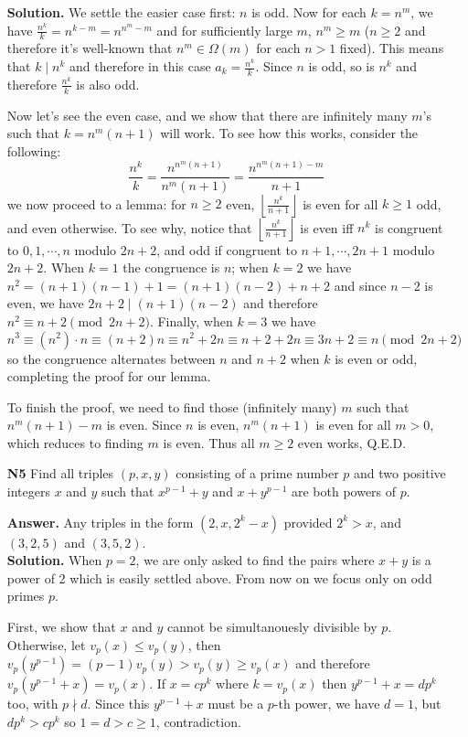 \documentclass[11pt,a4paper]{article}
\begin{document}
\begin{enumerate}
	\textbf{Solution.} We settle the easier case first: $n$ is odd. Now for each $k=n^m$, we have $\frac{n^k}{k}=n^{k-m}=n^{n^m-m}$ and for sufficiently large $m$, $n^m\ge m$ ($n\ge 2$ and therefore it's well-known that $n^m\in \Omega(m)$ for each $n>1$ fixed). This means that $k\mid n^k$ and therefore in this case $a_k=\frac{n^k}{k}$. Since $n$ is odd, so is $n^k$ and therefore $\frac{n^k}{k}$ is also odd. 
	
	Now let's see the even case, and we show that there are infinitely many $m$'s such that $k=n^m(n+1)$ will work. To see how this works, consider the following: 
	\[
	\frac{n^k}{k} = \frac{n^{n^m(n+1)}}{n^m(n+1)}
	=\frac{n^{n^m(n+1)-m}}{n+1}
	\]
	we now proceed to a lemma: for $n\ge 2$ even, $\left\lfloor\frac{n^k}{n+1}\right\rfloor$ is even for all $k\ge 1$ odd, and even otherwise. To see why, notice that $\left\lfloor\frac{n^k}{n+1}\right\rfloor$ is even iff $n^k$ is congruent to $0, 1, \cdots , n$ modulo $2n+2$, and odd if congruent to $n+1, \cdots , 2n+1$ modulo $2n+2$. 
	When $k=1$ the congruence is $n$; when $k=2$ we have $n^2=(n+1)(n-1)+1=(n+1)(n-2)+n+2$ and since $n-2$ is even, we have $2n+2\mid (n+1)(n-2)$ and therefore $n^2\equiv n+2\pmod{2n+2}$. 
	Finally, when $k=3$ we have \[n^3\equiv (n^2)\cdot n\equiv (n+2)n\equiv n^2+2n\equiv n+2+2n\equiv 3n+2\equiv n\pmod{2n+2}\]
	so the congruence alternates between $n$ and $n+2$ when $k$ is even or odd, completing the proof for our lemma. 
	
	To finish the proof, we need to find those (infinitely many) $m$ such that $n^m(n+1)-m$ is even. Since $n$ is even, $n^m(n+1)$ is even for all $m>0$, which reduces to finding $m$ is even. Thus all $m\ge 2$ even works, Q.E.D. 
	
	\item[\textbf{N5}] Find all triples $(p, x, y)$ consisting of a prime number $p$ and two positive integers $x$ and $y$ such that $x^{p -1} + y$ and $x + y^ {p -1}$ are both powers of $p$.
	
	\textbf{Answer.} Any triples in the form $(2, x, 2^k-x)$ provided $2^k>x$, and $(3, 2, 5)$ and $(3, 5, 2)$. \\
	\textbf{Solution.} When $p=2$, we are only asked to find the pairs where $x+y$ is a power of 2 which is easily settled above. From now on we focus only on odd primes $p$. 
	
	First, we show that $x$ and $y$ cannot be simultanouesly divisible by $p$. Otherwise, let $v_p(x)\le v_p(y)$, then $v_p(y^{p-1})=(p-1)v_p(y)>v_p(y)\ge v_p(x)$ and therefore $v_p(y^{p-1}+x)=v_p(x)$. If $x=cp^k$ where $k=v_p(x)$ then $y^{p-1}+x=dp^k$ too, with $p\nmid d$. Since this $y^{p-1}+x$ must be a $p$-th power, we have $d=1$, but $dp^k>cp^k$ so $1=d>c\ge 1$, contradiction. 
	

\end{enumerate}
\end{document}
